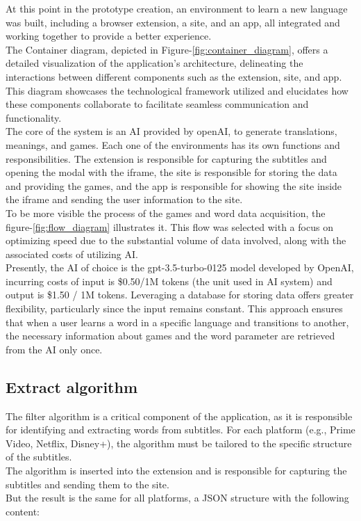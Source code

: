 \documentclass[12pt]{article}
\begin{document}
At this point in the prototype creation, an environment to learn a new language was built, including a browser extension, a site, and an app, all integrated and working together to provide a better experience. \\
The Container diagram, depicted in Figure-\ref{fig:container_diagram}, offers a detailed visualization of the application's architecture, delineating the interactions between different components such as the extension, site, and app. This diagram showcases the technological framework utilized and elucidates how these components collaborate to facilitate seamless communication and functionality. \\
The core of the system is an AI provided by openAI, to generate translations, meanings, and games. Each one of the environments has its own functions and responsibilities. The extension is responsible for capturing the subtitles and opening the modal with the iframe, the site is responsible for storing the data and providing the games, and the app is responsible for showing the site inside the iframe and sending the user information to the site. \\
To be more visible the process of the games and word data acquisition, the figure-\ref{fig:flow_diagram} illustrates it. This flow was selected with a focus on optimizing speed due to the substantial volume of data involved, along with the associated costs of utilizing AI. \\
Presently, the AI of choice is the gpt-3.5-turbo-0125 model developed by OpenAI, incurring costs of   input is \$0.50/1M tokens (the unit used in AI system) and output is  \$1.50 / 1M tokens. Leveraging a database for storing data offers greater flexibility, particularly since the input remains constant. This approach ensures that when a user learns a word in a specific language and transitions to another, the necessary information about games and the word parameter are retrieved from the AI only once. 
\subsection{Extract algorithm}
The filter algorithm is a critical component of the application, as it is responsible for identifying and extracting words from subtitles. For each platform (e.g., Prime Video, Netflix, Disney+), the algorithm must be tailored to the specific structure of the subtitles. \\
The algorithm is inserted into the extension and is responsible for capturing the subtitles and sending them to the site. \\
But the result is the same for all platforms, a JSON structure with the following content:
\end{document}
